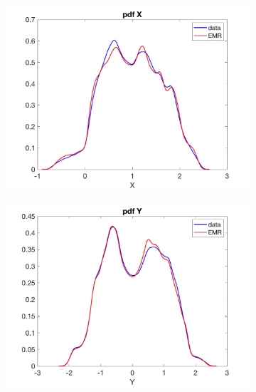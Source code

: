 \documentclass[12pt]{article}
\begin{document}
\begin{figure}[H]
	\centering
	\begin{subfigure}[b]{0.3\textwidth}
		\centering
		\includegraphics[width=\textwidth]{plots/l84l63/pdfxl840025.png}
	\end{subfigure}
	\hfill
	\begin{subfigure}[b]{0.3\textwidth}
		\centering
		\includegraphics[width=\textwidth]{plots/l84l63/pdfyl840025.png}
	\end{subfigure}
	\hfill
	\begin{subfigure}[b]{0.3\textwidth}
		\centering

\end{subfigure}
\end{figure}
\end{document}
